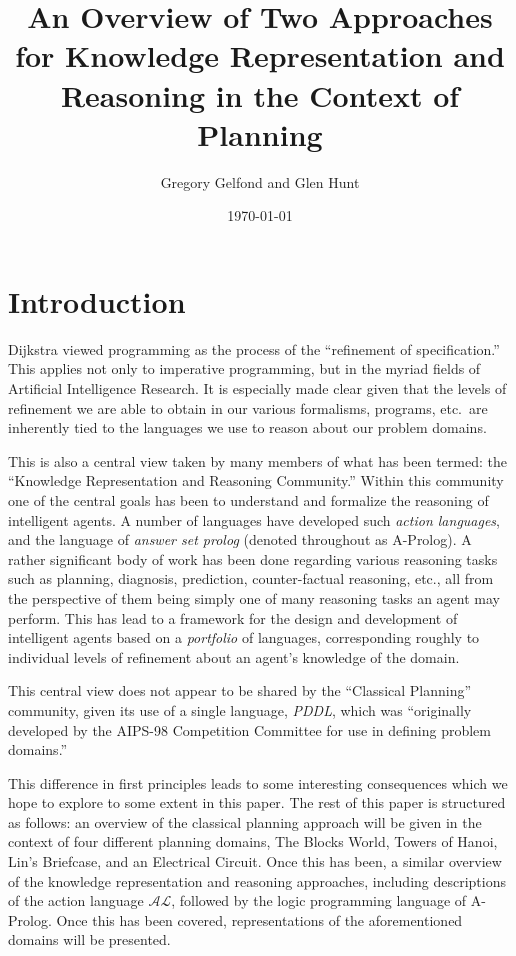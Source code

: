 \documentclass{article}
\title{An Overview of Two Approaches for Knowledge Representation and Reasoning in the Context of Planning}
\author{Gregory Gelfond and Glen Hunt}
\date{\today}
\newcommand{\AL}{\ensuremath{\mathcal{AL}}}
\begin{document}
\maketitle
\tableofcontents
\pagebreak

\section{Introduction}

Dijkstra viewed programming as the process of the ``refinement of specification.'' This applies not only to imperative programming, but in the myriad fields of Artificial Intelligence Research. It is especially made clear given that the levels of refinement we are able to obtain in our various formalisms, programs, etc.\, are inherently tied to the languages we use to reason about our problem domains.

This is also a central view taken by many members of what has been termed: the ``Knowledge Representation and Reasoning Community.'' Within this community one of the central goals has been to understand and formalize the reasoning of intelligent agents. A number of languages have developed such \emph{action languages}, and the language of \emph{answer set prolog} (denoted throughout as A-Prolog). A rather significant body of work has been done regarding various reasoning tasks such as planning, diagnosis, prediction, counter-factual reasoning, etc., all from the perspective of them being simply one of many reasoning tasks an agent may perform. This has lead to a framework for the design and development of intelligent agents based on a \emph{portfolio} of languages, corresponding roughly to individual levels of refinement about an agent's knowledge of the domain.

This central view does not appear to be shared by the ``Classical Planning'' community, given its use of a single language, \emph{PDDL}, which was ``originally developed by the AIPS-98 Competition Committee for use in defining problem domains.''

This difference in first principles leads to some interesting consequences which we hope to explore to some extent in this paper. The rest of this paper is structured as follows: an overview of the classical planning approach will be given in the context of four different planning domains, The Blocks World, Towers of Hanoi, Lin's Briefcase, and an Electrical Circuit. Once this has been, a similar overview of the knowledge representation and reasoning approaches, including descriptions of the action language $\AL$, followed by the logic programming language of A-Prolog. Once this has been covered, representations of the aforementioned domains will be presented.
\end{document}
